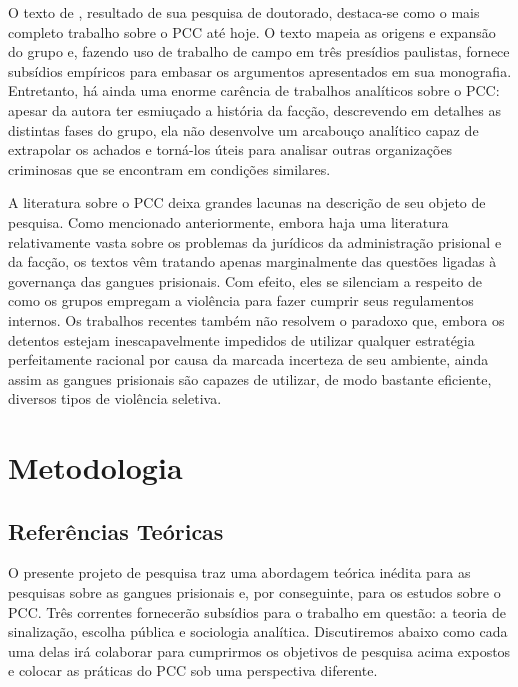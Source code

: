 \documentclass[a4paper,11pt]{article}
\begin{document}
O texto de \citet{dias2011pulverizaccao}, resultado de sua pesquisa de doutorado, destaca-se como o mais completo trabalho sobre o PCC até hoje. O texto mapeia as origens e expansão do grupo e, fazendo uso de trabalho de campo em três presídios paulistas, fornece subsídios empíricos para embasar os argumentos apresentados em sua monografia. Entretanto, há ainda uma enorme carência de trabalhos analíticos sobre o PCC: apesar da autora ter esmiuçado a história da facção, descrevendo em detalhes as distintas fases do grupo, ela não desenvolve um arcabouço analítico capaz de extrapolar os achados e torná-los úteis para analisar outras organizações criminosas que se encontram em condições similares.  

A literatura sobre o PCC deixa grandes lacunas na descrição de seu objeto de pesquisa. 
Como mencionado anteriormente, embora haja uma literatura relativamente vasta sobre os problemas da jurídicos da administração prisional e da facção, os textos vêm tratando apenas marginalmente das questões ligadas à governança das gangues prisionais. Com efeito, eles se silenciam a respeito de como os grupos empregam a violência para fazer cumprir seus regulamentos internos. Os trabalhos recentes também não resolvem o paradoxo que, embora os detentos estejam inescapavelmente impedidos de utilizar qualquer estratégia perfeitamente racional por causa da marcada incerteza de seu ambiente, ainda assim as gangues prisionais são capazes de utilizar, de modo bastante eficiente, diversos tipos de violência seletiva.

\section{Metodologia}

\subsection{Referências Teóricas}

O presente projeto de pesquisa traz uma abordagem teórica inédita para as pesquisas sobre as gangues prisionais e, por conseguinte, para os estudos sobre o PCC. Três correntes fornecerão subsídios para o trabalho em questão: a teoria de sinalização, escolha pública e sociologia analítica. Discutiremos abaixo como cada uma delas irá colaborar para cumprirmos os objetivos de pesquisa acima expostos e colocar as práticas do PCC sob uma perspectiva diferente.
\end{document}
